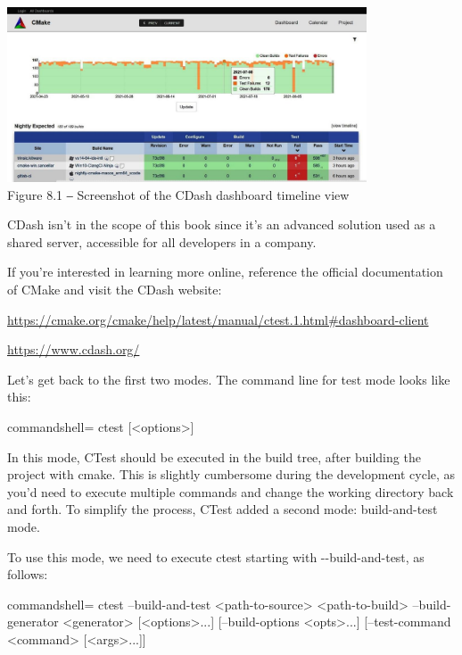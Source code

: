 \begin{center}
\includegraphics[width=0.8\textwidth]{content/3/chapter8/images/1.jpg}\\
Figure 8.1 ‒ Screenshot of the CDash dashboard timeline view
\end{center}

CDash isn't in the scope of this book since it's an advanced solution used as a shared server, accessible for all developers in a company.

\begin{tcolorbox}[colback=blue!5!white,colframe=blue!75!black,title=Note]
If you're interested in learning more online, reference the official documentation of CMake and visit the CDash website:

\url{https://cmake.org/cmake/help/latest/manual/ctest.1.html\#dashboard-client}

\url{https://www.cdash.org/}
\end{tcolorbox}

Let's get back to the first two modes. The command line for test mode looks like this:

\begin{tcblisting}{commandshell={}}
ctest [<options>]
\end{tcblisting}

In this mode, CTest should be executed in the build tree, after building the project with cmake. This is slightly cumbersome during the development cycle, as you'd need to execute multiple commands and change the working directory back and forth. To simplify the process, CTest added a second mode: build-and-test mode.


To use this mode, we need to execute ctest starting with -{}-build-and-test, as follows:

\begin{tcblisting}{commandshell={}}
ctest --build-and-test <path-to-source> <path-to-build>
      --build-generator <generator> [<options>...]
      [--build-options <opts>...]
      [--test-command <command> [<args>...]]
\end{tcblisting}

